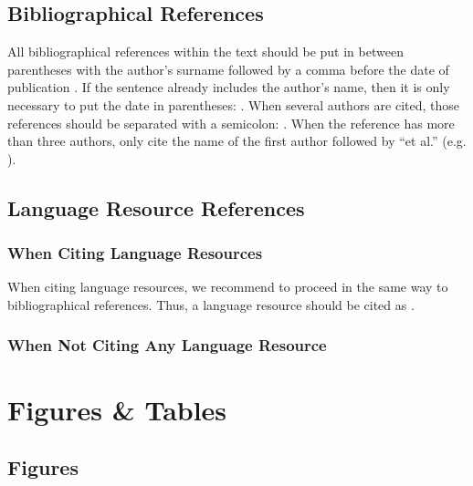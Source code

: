 \documentclass{lrec}
\begin{document}
\subsection{Bibliographical References}

All bibliographical references within the text should be put in between
parentheses with the author's surname followed by a comma before the date
of publication \parencite{Martin-90}. If the sentence already includes the author's
name, then it is only necessary to put the date in parentheses:
\textcite{Martin-90}. When several authors are cited, those references should be
separated with a semicolon: \parencite{Martin-90,CastorPollux-92}. When the reference
has more than three authors, only cite the name of the first author followed by
``et al.'' (e.g. \parencite{Superman-Batman-Catwoman-Spiderman-00}).

\subsection{Language Resource References}

\subsubsection{When Citing Language Resources}

When citing language resources, we recommend to proceed in the same way to
bibliographical references.
Thus, a language resource should be cited as \parencite{speecon}.

\subsubsection{When Not Citing Any Language Resource}

\section{Figures \& Tables}
\subsection{Figures}
\end{document}
